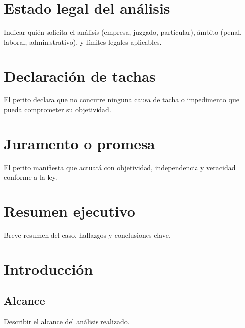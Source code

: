\documentclass[12pt,a4paper]{article}
\begin{document}
\newpage

\section{Estado legal del análisis}
Indicar quién solicita el análisis (empresa, juzgado, particular), ámbito (penal, laboral, administrativo), y límites legales aplicables.

\newpage

\section{Declaración de tachas}
El perito declara que no concurre ninguna causa de tacha o impedimento que pueda comprometer su objetividad.

\newpage

\section{Juramento o promesa}
El perito manifiesta que actuará con objetividad, independencia y veracidad conforme a la ley.

\newpage

\section{Resumen ejecutivo}
Breve resumen del caso, hallazgos y conclusiones clave.

\newpage

\section{Introducción}

\subsection{Alcance}
Describir el alcance del análisis realizado.
\end{document}
